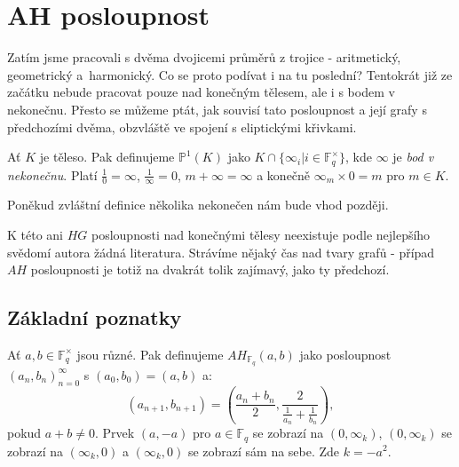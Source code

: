 \documentclass[12pt]{report}
\begin{document}
\chapter{AH posloupnost}
Zatím jsme pracovali s dvěma dvojicemi průměrů z trojice - aritmetický, geometrický a~harmonický. Co se proto podívat i na tu poslední? Tentokrát již ze začátku nebude pracovat pouze nad konečným tělesem, ale i s bodem v nekonečnu. Přesto se můžeme ptát, jak souvisí tato posloupnost a její grafy s předchozími dvěma, obzvláště ve spojení s eliptickými křivkami.

\begin{definice}
Ať $K$ je těleso. Pak definujeme $\mathbb{P}^{1} (K)$ jako $K \cap \lbrace \infty_i  \vert i \in \mathbb{F}_q ^{\times} \rbrace$, kde $\infty$ je \textit{bod v nekonečnu}. Platí $\frac{1}{0} = \infty$, $\frac{1}{\infty} = 0$, $m+\infty = \infty$ a konečně $\infty_m \times 0 = m$ pro $m \in K$.
\end{definice}

Poněkud zvláštní definice několika nekonečen nám bude vhod později.

K této ani $HG$ posloupnosti nad konečnými tělesy neexistuje podle nejlepšího svědomí autora žádná literatura. Strávíme nějaký čas nad tvary grafů - případ $AH$ posloupnosti je totiž na dvakrát tolik zajímavý, jako ty předchozí.

\section{Základní poznatky}


\begin{definice}
Ať $a,b \in \mathbb{F}_q ^{\times}$ jsou různé. Pak definujeme $AH_{\mathbb{F}_q}(a,b)$ jako posloupnost $(a_n,b_n)_{n=0}^{\infty}$ s $(a_0,b_0) = (a,b)$ a:
\begin{equation*}
\left(a_{n+1},b_{n+1} \right) = \left(\frac{a_n+b_n}{2}, \frac{2}{\frac{1}{a_n} + \frac{1}{b_n}} \right),
\end{equation*}
pokud $a+b \neq 0$. Prvek $(a,-a)$ pro $a \in \mathbb{F}_q$ se zobrazí na $(0,\infty_k)$, $(0,\infty_k)$ se zobrazí na $(\infty_k,0)$ a $(\infty_k,0)$ se zobrazí sám na sebe. Zde $k = -a^2$.
\end{definice}
\end{document}
